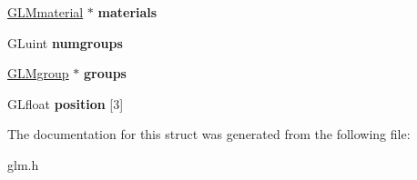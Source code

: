 \begin{DoxyCompactItemize}
\item 
\hypertarget{struct__GLMmodel_a0bcb1bd406622c8ff09770796fe90278}{\hyperlink{struct__GLMmaterial}{\-G\-L\-Mmaterial} $\ast$ {\bfseries materials}}\label{struct__GLMmodel_a0bcb1bd406622c8ff09770796fe90278}

\item 
\hypertarget{struct__GLMmodel_a54e1b2ca7e03175c3189a2f5db7f53de}{\-G\-Luint {\bfseries numgroups}}\label{struct__GLMmodel_a54e1b2ca7e03175c3189a2f5db7f53de}

\item 
\hypertarget{struct__GLMmodel_ad7401a2f601a5720fc560bd49111436c}{\hyperlink{struct__GLMgroup}{\-G\-L\-Mgroup} $\ast$ {\bfseries groups}}\label{struct__GLMmodel_ad7401a2f601a5720fc560bd49111436c}

\item 
\hypertarget{struct__GLMmodel_acab837a5075b2f0301b4c6c8c4a465b4}{\-G\-Lfloat {\bfseries position} \mbox{[}3\mbox{]}}\label{struct__GLMmodel_acab837a5075b2f0301b4c6c8c4a465b4}

\end{DoxyCompactItemize}


\-The documentation for this struct was generated from the following file\-:\begin{DoxyCompactItemize}
\item 
glm.\-h\end{DoxyCompactItemize}
